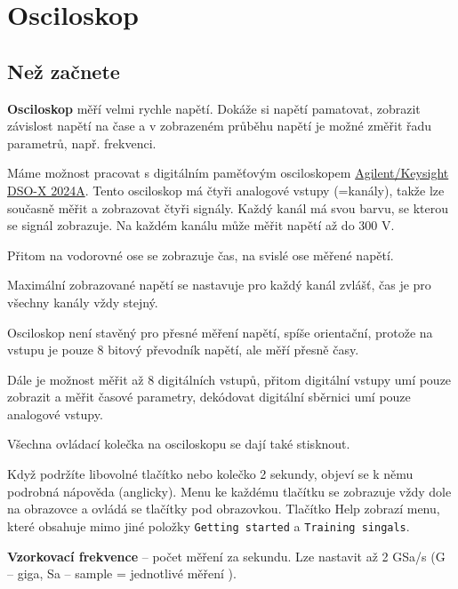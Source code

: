 

\section{Osciloskop}

\subsection{Než začnete}


\textbf{Osciloskop} měří velmi rychle napětí. Dokáže si napětí pamatovat, zobrazit závislost napětí na čase a v zobrazeném průběhu napětí je možné změřit řadu parametrů, např. frekvenci. 


Máme možnost pracovat s digitálním paměťovým osciloskopem
\href{https://www.keysight.com/en/pdx-x201837-pn-DSOX2024A/oscilloscope-200-mhz-4-analog-channels?nid=-32542.1150190\&cc=CZ\&lc=eng\&pm=ov}{Agilent/Keysight DSO-X 2024A}.
Tento osciloskop má čtyři analogové vstupy (=kanály), takže lze současně měřit a zobrazovat čtyři signály. Každý kanál má svou barvu, se kterou se signál zobrazuje. 
Na každém kanálu může měřit napětí až do 300 V. %

Přitom na vodorovné ose se zobrazuje čas, na svislé ose měřené napětí. 

Maximální zobrazované napětí se nastavuje pro každý kanál zvlášť, čas je pro všechny kanály vždy stejný.  

Osciloskop není stavěný pro přesné měření napětí, spíše orientační, protože na vstupu je pouze 8 bitový převodník napětí, ale měří přesně časy.


Dále je možnost měřit až 8 digitálních vstupů, přitom digitální vstupy umí pouze zobrazit a měřit časové parametry,  
dekódovat digitální sběrnici umí pouze analogové vstupy. 

Všechna ovládací kolečka na osciloskopu se dají také stisknout.

Když podržíte libovolné tlačítko nebo kolečko  2 sekundy, objeví se k němu podrobná nápověda (anglicky). 
Menu ke každému tlačítku se zobrazuje vždy dole na obrazovce a ovládá se tlačítky pod obrazovkou.  
Tlačítko Help zobrazí menu, které  obsahuje mimo jiné položky \texttt{Getting started} a  \texttt{Training singals}. 

\textbf{Vzorkovací frekvence} -- počet měření za sekundu. Lze nastavit až 2 GSa/s 
(G -- giga, Sa -- sample = jednotlivé měření ).

